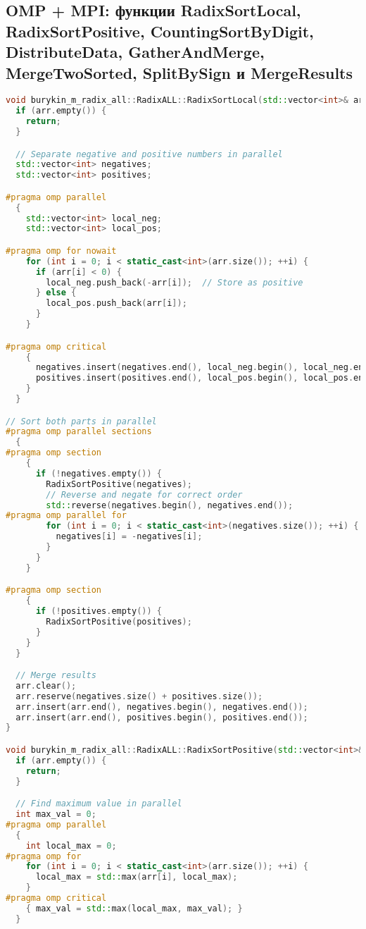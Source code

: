 \documentclass[12pt]{article}
\begin{document}
\subsection*{OMP + MPI: функции RadixSortLocal, RadixSortPositive, CountingSortByDigit, DistributeData, GatherAndMerge, MergeTwoSorted, SplitBySign и MergeResults}
\begin{lstlisting}[language=C++]
void burykin_m_radix_all::RadixALL::RadixSortLocal(std::vector<int>& arr) {
  if (arr.empty()) {
    return;
  }

  // Separate negative and positive numbers in parallel
  std::vector<int> negatives;
  std::vector<int> positives;

#pragma omp parallel
  {
    std::vector<int> local_neg;
    std::vector<int> local_pos;

#pragma omp for nowait
    for (int i = 0; i < static_cast<int>(arr.size()); ++i) {
      if (arr[i] < 0) {
        local_neg.push_back(-arr[i]);  // Store as positive
      } else {
        local_pos.push_back(arr[i]);
      }
    }

#pragma omp critical
    {
      negatives.insert(negatives.end(), local_neg.begin(), local_neg.end());
      positives.insert(positives.end(), local_pos.begin(), local_pos.end());
    }
  }

// Sort both parts in parallel
#pragma omp parallel sections
  {
#pragma omp section
    {
      if (!negatives.empty()) {
        RadixSortPositive(negatives);
        // Reverse and negate for correct order
        std::reverse(negatives.begin(), negatives.end());
#pragma omp parallel for
        for (int i = 0; i < static_cast<int>(negatives.size()); ++i) {
          negatives[i] = -negatives[i];
        }
      }
    }

#pragma omp section
    {
      if (!positives.empty()) {
        RadixSortPositive(positives);
      }
    }
  }

  // Merge results
  arr.clear();
  arr.reserve(negatives.size() + positives.size());
  arr.insert(arr.end(), negatives.begin(), negatives.end());
  arr.insert(arr.end(), positives.begin(), positives.end());
}

void burykin_m_radix_all::RadixALL::RadixSortPositive(std::vector<int>& arr) {
  if (arr.empty()) {
    return;
  }

  // Find maximum value in parallel
  int max_val = 0;
#pragma omp parallel
  {
    int local_max = 0;
#pragma omp for
    for (int i = 0; i < static_cast<int>(arr.size()); ++i) {
      local_max = std::max(arr[i], local_max);
    }
#pragma omp critical
    { max_val = std::max(local_max, max_val); }
  }


\end{lstlisting}
\end{document}
